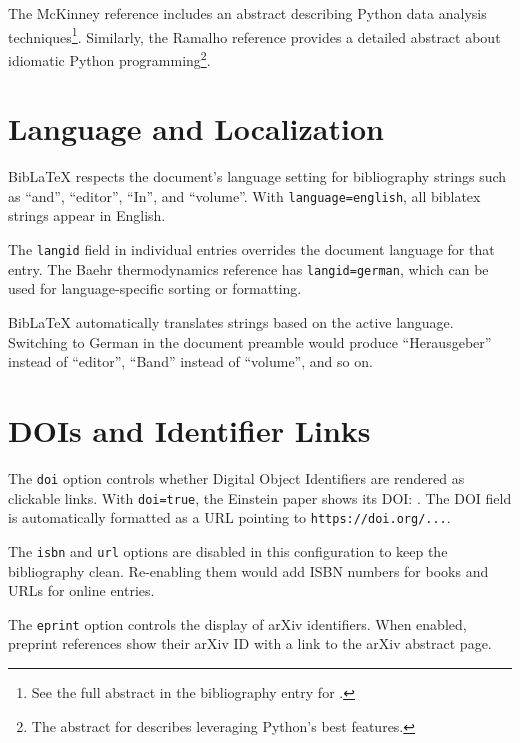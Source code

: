 \documentclass[
    language=english,
    doctype=article,
    institution=none,
]{../../omnilatex}
\begin{document}
The McKinney reference includes an abstract describing Python data analysis
techniques\footnote{See the full abstract in the bibliography entry for
.}.  Similarly, the Ramalho
reference provides a detailed abstract about idiomatic Python
programming\footnote{The abstract for 
describes leveraging Python's best features.}.

\section{Language and Localization}
\label{sec:localization}

BibLaTeX respects the document's language setting for bibliography strings
such as ``and'', ``editor'', ``In'', and ``volume''.  With
\texttt{language=english}, all biblatex strings appear in English.

The \texttt{langid} field in individual entries overrides the document
language for that entry.  The Baehr thermodynamics reference
\cite{baehrThermodynamikGrundlagenUnd2016} has \texttt{langid=german},
which can be used for language-specific sorting or formatting.

BibLaTeX automatically translates strings based on the active language.
Switching to German in the document preamble would produce ``Herausgeber''
instead of ``editor'', ``Band'' instead of ``volume'', and so on.

\section{DOIs and Identifier Links}
\label{sec:identifiers}

The \texttt{doi} option controls whether Digital Object Identifiers are
rendered as clickable links.  With \texttt{doi=true}, the Einstein paper
shows its DOI: \cite{einstein1905}.  The DOI field is automatically
formatted as a URL pointing to \texttt{https://doi.org/...}.

The \texttt{isbn} and \texttt{url} options are disabled in this
configuration to keep the bibliography clean.  Re-enabling them would add
ISBN numbers for books and URLs for online entries.

The \texttt{eprint} option controls the display of arXiv identifiers.
When enabled, preprint references show their arXiv ID with a link to the
arXiv abstract page.
\end{document}
